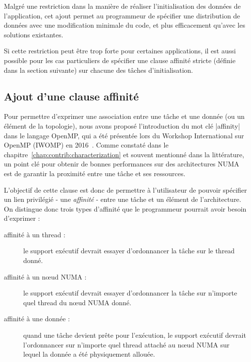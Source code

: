 Malgré une restriction dans la manière de réaliser l'initialisation des données de l'application, cet ajout permet au programmeur de spécifier une distribution de données avec une modification minimale du code, et plus efficacement qu'avec les solutions existantes.

Si cette restriction peut être trop forte pour certaines applications, il est aussi possible pour les cas particuliers de spécifier une clause affinité stricte (définie dans la section suivante) sur chacune des tâches d'initialisation.



\subsection{Ajout d'une clause affinité}\label{sec:openmp:langage:affinity}

Pour permettre d'exprimer une association entre une tâche et une donnée (ou un élément de la topologie), nous avons proposé l'introduction du mot clé |affinity| dans le langage OpenMP, qui a été présentée lors du Workshop International sur OpenMP (IWOMP) en 2016~\cite{Virouleau2016b}.
Comme constaté dans le chapitre~\ref{chap:contrib:characterization} et souvent mentionné dans la littérature, un point clé pour obtenir de bonnes performances sur des architectures NUMA est de garantir la proximité entre une tâche et ses ressources.

L'objectif de cette clause est donc de permettre à l'utilisateur de pouvoir spécifier un lien privilégié - une \emph{affinité} - entre une tâche et un élément de l'architecture.
On distingue donc trois types d'affinité que le programmeur pourrait avoir besoin d'exprimer :

\begin{description}
    \item [affinité à un thread :]
      le support exécutif devrait essayer d'ordonnancer la tâche sur le thread donné.
    \item [affinité à un nœud NUMA :]
      le support exécutif devrait essayer d'ordonnancer la tâche sur n'importe
      quel thread du nœud NUMA donné.

    \item [affinité à une donnée :]
      quand une tâche devient prête pour l'exécution, le support exécutif devrait
      l'ordonnancer sur n'importe quel thread attaché au nœud NUMA sur lequel
      la donnée a été physiquement allouée.
\end{description}

